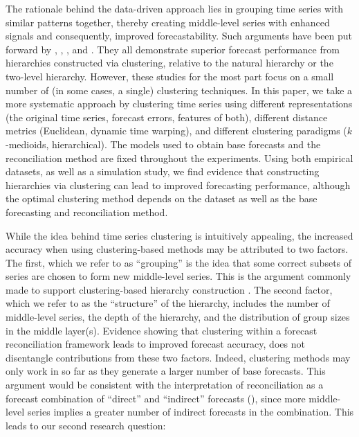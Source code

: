 \documentclass[a4paper,review,12pt,authoryear]{elsarticle}
\begin{document}
The rationale behind the data-driven approach lies in grouping time series with similar patterns together, thereby creating middle-level series with enhanced signals and consequently, improved forecastability. Such arguments have been put forward by  \cite{pangHierarchicalElectricityTime2018}, \cite{liForecastReconciliationApproach2019}, \cite{pangHierarchicalElectricityTime2022}, and \cite{matteraImprovingOutofSampleForecasts2023}. They all demonstrate superior forecast performance from hierarchies constructed via clustering, relative to the natural hierarchy or the two-level hierarchy. However, these studies for the most part focus on a small number of (in some cases, a single) clustering techniques. In this paper, we take a more systematic approach by clustering time series using different representations (the original time series, forecast errors, features of both), different distance metrics (Euclidean, dynamic time warping), and different clustering paradigms ($k$-medioids, hierarchical). The models used to obtain base forecasts and the reconciliation method are fixed throughout the experiments. Using both empirical datasets, as well as a simulation study, we find evidence that constructing hierarchies via clustering can lead to improved forecasting performance, although the optimal clustering method depends on the dataset as well as the base forecasting and reconciliation method.%

While the idea behind time series clustering is intuitively appealing, the increased accuracy when using clustering-based methods may be attributed to two factors. The first, which we refer to as     ``grouping'' is the idea that some correct subsets of series are chosen to form new middle-level series. This is the argument commonly made to support clustering-based hierarchy construction \citep[see \textit{e.g.}][]{liForecastReconciliationApproach2019, pangHierarchicalElectricityTime2022, matteraImprovingOutofSampleForecasts2023}.  
The second factor, which we refer to as the ``structure'' of the hierarchy, includes the number of middle-level series, the depth of the hierarchy, and the distribution of group sizes in the middle layer(s). Evidence showing that clustering within a forecast reconciliation framework leads to improved forecast accuracy, does not disentangle contributions from these two factors. Indeed, clustering methods may only work in so far as they generate a larger number of base forecasts. {This argument would be consistent with the interpretation of reconciliation as a forecast combination of ``direct'' and ``indirect'' forecasts (\citealp{hollymanUnderstandingForecastReconciliation2021, di2024forecast}), since more middle-level series implies a greater number of indirect forecasts in the combination.} This leads to our second research question:
\end{document}

